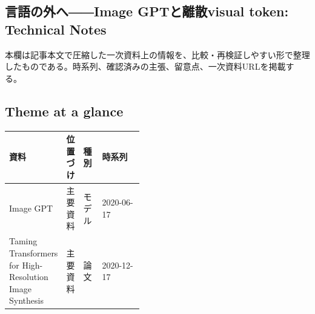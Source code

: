 \subsection*{言語の外へ――Image GPTと離散visual token: Technical Notes}
本欄は記事本文で圧縮した一次資料上の情報を、比較・再検証しやすい形で整理したものである。時系列、確認済みの主張、留意点、一次資料URLを掲載する。
\smallskip
{}\par
\medskip
\subsection*{Theme at a glance}
\begin{center}
\footnotesize
\begin{tabularx}{\linewidth}{@{}p{0.20\linewidth}p{0.10\linewidth}p{0.14\linewidth}X@{}}
\toprule
資料 & 位置づけ & 種別 & 時系列 \\
\midrule
Image GPT & 主要資料 & モデル & 2020-06-17 \\
Taming Transformers for High-Resolution Image Synthesis & 主要資料 & 論文 & 2020-12-17 \\
\bottomrule
\end{tabularx}
\end{center}
\normalsize

